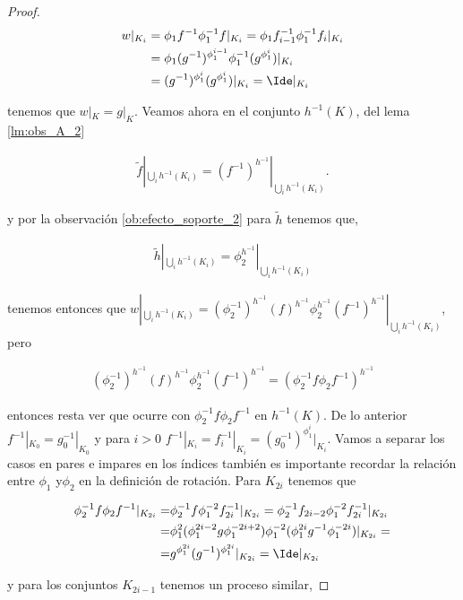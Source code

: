 \begin{proof}
\begin{align*}
w|_{K_i} & = \phi_1f^{-1}\phi_1^{-1}f|_{K_i}=\phi_1f_{i-1}^{-1}\phi_1^{-1}f_i|_{K_i}\\
& = \phi_1 (g^{-1})^{\phi_1^{i-1}} \phi_1^{-1} (g^{\phi_1^i})|_{K_i}\\
& = (g^{-1})^{\phi_1^i} (g^{\phi_1^i})|_{K_i}= \Ide|_{K_i}
\end{align*}


tenemos que $w|_K=g|_K.$ Veamos ahora en el conjunto $h^{-1}(K)$, del lema \ref{lm:obs_A_2}

\begin{align*}
\tilde{f}|_{\bigcup_i h^{-1}(K_i)} = (f^{-1})^{h^{-1}}|_{\bigcup_i h^{-1}(K_i)}.
\end{align*}

y por la observación \ref{ob:efecto_soporte_2}  para $\tilde{h}$ tenemos que,

\begin{align*}
\tilde{h}|_{\bigcup_i h^{-1}(K_i)}=\phi_2^{h^{-1}}|_{\bigcup_i h^{-1}(K_i)}
\end{align*}

tenemos entonces que $w|_{\bigcup_i h^{-1}(K_i)}= (\phi_2^{-1})^{h^{-1}}(f)^{h^{-1}}\phi_2^{h^{-1}}(f^{-1})^{h^{-1}}|_{\bigcup_i h^{-1}(K_i)}$, pero 

\begin{align*}
(\phi_2^{-1})^{h^{-1}}(f)^{h^{-1}}\phi_2^{h^{-1}}(f^{-1})^{h^{-1}}=(\phi_2^{-1} f \phi_2 f^{-1})^{h^{-1}}
\end{align*}

entonces resta ver que ocurre con  $\phi_2^{-1} f \phi_2 f^{-1}$ en $h^{-1}(K)$. De lo anterior $f^{-1}|_{K_0}=g_0^{-1}|_{K_0}$ y para $i>0 $ $f^{-1}|_{K_i}=f_i^{-1}|_{K_i}=(g_0^{-1})^{\phi_1^i}|_{K_i}$. Vamos a separar los casos en pares e impares en los índices también es importante recordar la relación entre $\phi_1$ y$\phi_2$ en la definición de rotación. Para $K_{2i}$ tenemos que

\begin{align*}
\phi_2^{-1}f\phi_2f^{-1}|_{K_{2i}} = & \phi_2^{-1}f \phi_1^{-2} f_{2i}^{-1}|_{K_{2i}} = \phi_2^{-1}f_{2i-2} \phi_1^{-2} f_{2i}^{-1}|_{K_{2i}} \\
=& \phi_1^2(\phi_1^{2i-2}g\phi_1^{-2i+2})\phi_1^{-2}(\phi_1^{2i}g^{-1}\phi_1^{-2i})|_{K_{2i}}= \\
= & g^{\phi_1^{2i}}(g^{-1})^{\phi_1^{2i}}|_{K_{2i}}=\Ide|_{K_{2i}}
\end{align*}

y para los conjuntos $K_{2i-1}$ tenemos un proceso similar, 


\end{proof}
